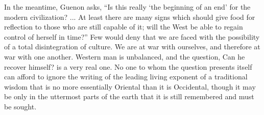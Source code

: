 In the meantime, Guenon asks, ``Is this really `the beginning of an end' for the modern civilization? ... At least there are many signs which should give food for reflection to those who are still capable of it; will the West be able to regain control of herself in time?'' Few would deny that we are faced with the possibility of a total disintegration of culture. We are at war with ourselves, and therefore at war with one another. Western man is unbalanced, and the question, Can he recover himself? is a very real one. No one to whom the question presents itself can afford to ignore the writing of the leading living exponent of a traditional wisdom that is no more essentially Oriental than it is Occidental, though it may be only in the uttermost parts of the earth that it is still remembered and must be sought.



